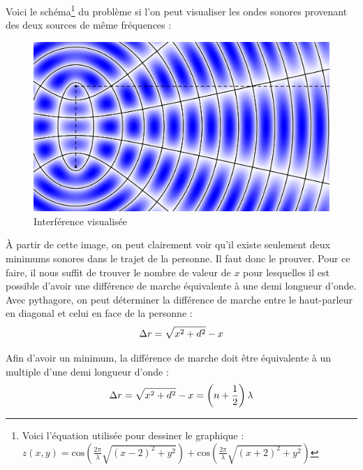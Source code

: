 \documentclass[11pt]{article}
\numberwithin{equation}{section}
\def\note_1{\footnote{Voici l'équation utilisée pour dessiner le graphique :\\\center$z(x,y) = \mathrm{cos}(\frac{2\pi}{\lambda}\sqrt{(x-2)^2+y^2})+\mathrm{cos}(\frac{2\pi}{\lambda}\sqrt{(x+2)^2+y^2})$}}
\begin{document}
Voici le schéma\note_1 du problème si l'on peut visualiser les ondes sonores provenant des deux sources de même fréquences :
\begin{figure}[h]
	\caption{Interférence visualisée}
	\centering
	\includegraphics[scale=0.1]{plot.png}
\end{figure}

À partir de cette image, on peut clairement voir qu'il existe seulement deux minimums sonores dans le trajet de la personne. Il faut donc le prouver. Pour ce faire, il nous suffit de trouver le nombre de valeur de $x$ pour lesquelles il est possible d'avoir une différence de marche équivalente à une demi longueur d'onde.\\

Avec pythagore, on peut déterminer la différence de marche entre le haut-parleur en diagonal et celui en face de la personne :
\begin{equation*}
	\Delta r=\sqrt{x^2+d^2}-x\\
\end{equation*}

Afin d'avoir un minimum, la différence de marche doit être équivalente à un multiple d'une demi longueur d'onde :
\begin{equation*}
	\Delta r=\sqrt{x^2+d^2}-x=\left (n+\frac{1}{2}\right )\lambda\\
\end{equation*}
\pagebreak
\end{document}
